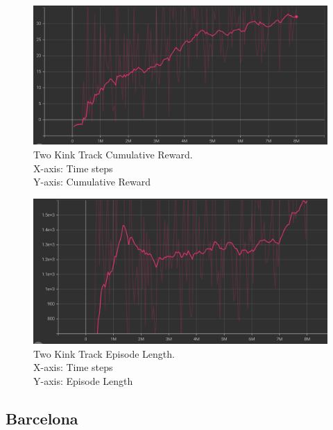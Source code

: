 \begin{figure}[H]
    \centering
    \includegraphics[width=1.0\textwidth]{images/graphs/TwoKink-Reward.png}
    \caption{\centering Two Kink Track Cumulative Reward. \\ X-axis: Time steps \\ Y-axis: Cumulative Reward}
    \label{fig:rl}
\end{figure}

\begin{figure}[H]
    \centering
    \includegraphics[width=1.0\textwidth]{images/graphs/TwoKink-Episode.png}
    \caption{\centering Two Kink Track Episode Length. \\ X-axis: Time steps \\ Y-axis: Episode Length}
    \label{fig:rl}
\end{figure}





\subsection{Barcelona}

